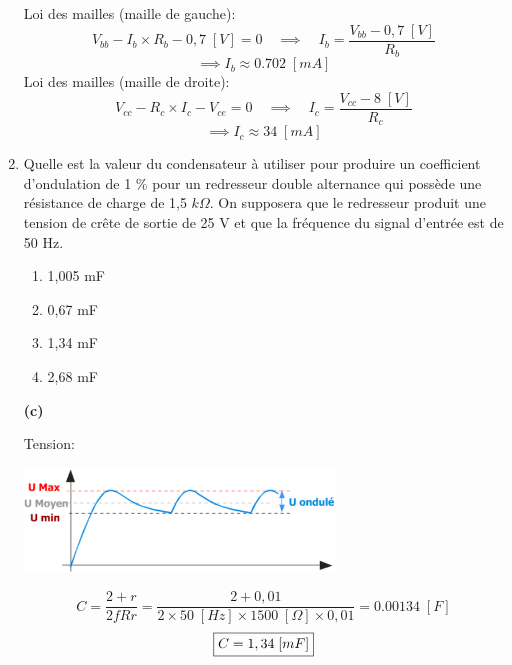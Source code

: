\documentclass[a4paper]{article}
\begin{document}
\begin{enumerate}
\begin{example}
    Loi des mailles (maille de gauche):
    \[
        V_{bb} - I_b \times R_b - 0,7 \; [V] = 0
        \quad \implies \quad
        I_b = \frac{V_{bb} - 0,7 \; [V]}{R_b}
    \]
    \[ \implies I_b \approx 0.702 \; [mA] \]
    Loi des mailles (maille de droite):
    \[
        V_{cc} - R_c \times I_c - V_{ce} = 0
        \quad \implies \quad
        I_c = \frac{V_{cc} - 8 \; [V]}{R_c}
    \]
    \[ \implies I_c \approx 34 \; [mA] \]
\end{example}





\item Quelle est la valeur du condensateur à utiliser pour produire un coefficient d’ondulation de 1 \% pour un redresseur double alternance qui possède une résistance de charge de 1,5 $ k \Omega $. On supposera que le redresseur produit une tension de crête de sortie de 25 V et que la fréquence du signal d’entrée est de 50 Hz.
\begin{enumerate}
    \item 1,005 mF
    \item 0,67 mF
    \item 1,34 mF
    \item 2,68 mF
\end{enumerate}
\begin{example}
    \textbf{(c)}

    Tension:
    \begin{center}
        \includegraphics[width=0.65\textwidth]{images/filtrage-condensateur.PNG}
    \end{center}
    \[
        C = \frac{2 + r}{2 f R r}
        = \frac{2 + 0,01}{2 \times 50 \; [Hz] \times 1500 \; [\Omega] \times 0,01}
        = 0.00134 \; [F]
    \]
    \[ \fbox{$\displaystyle C = 1,34 \; [mF] $} \]
\end{example}






\end{enumerate}
\end{document}

